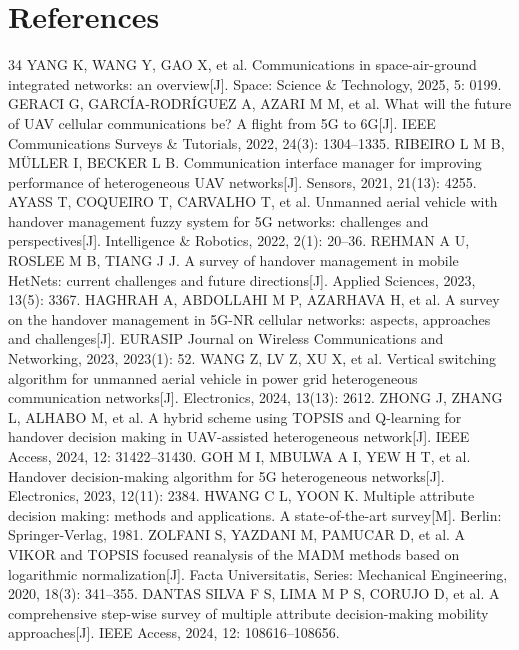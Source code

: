 \documentclass[10pt,a4paper]{article}
\begin{document}
\section*{References}
{\renewcommand{\refname}{}
\vspace{-2.5em}
\begin{thebibliography}{34}
 YANG K, WANG Y, GAO X, et al. Communications in space-air-ground integrated networks: an overview[J]. Space: Science \& Technology, 2025, 5: 0199.
 GERACI G, GARCÍA-RODRÍGUEZ A, AZARI M M, et al. What will the future of UAV cellular communications be? A flight from 5G to 6G[J]. IEEE Communications Surveys \& Tutorials, 2022, 24(3): 1304--1335.
 RIBEIRO L M B, M\"ULLER I, BECKER L B. Communication interface manager for improving performance of heterogeneous UAV networks[J]. Sensors, 2021, 21(13): 4255.
 AYASS T, COQUEIRO T, CARVALHO T, et al. Unmanned aerial vehicle with handover management fuzzy system for 5G networks: challenges and perspectives[J]. Intelligence \& Robotics, 2022, 2(1): 20--36.
 REHMAN A U, ROSLEE M B, TIANG J J. A survey of handover management in mobile HetNets: current challenges and future directions[J]. Applied Sciences, 2023, 13(5): 3367.
 HAGHRAH A, ABDOLLAHI M P, AZARHAVA H, et al. A survey on the handover management in 5G-NR cellular networks: aspects, approaches and challenges[J]. EURASIP Journal on Wireless Communications and Networking, 2023, 2023(1): 52.
 WANG Z, LV Z, XU X, et al. Vertical switching algorithm for unmanned aerial vehicle in power grid heterogeneous communication networks[J]. Electronics, 2024, 13(13): 2612.
 ZHONG J, ZHANG L, ALHABO M, et al. A hybrid scheme using TOPSIS and Q-learning for handover decision making in UAV-assisted heterogeneous network[J]. IEEE Access, 2024, 12: 31422--31430.
 GOH M I, MBULWA A I, YEW H T, et al. Handover decision-making algorithm for 5G heterogeneous networks[J]. Electronics, 2023, 12(11): 2384.
 HWANG C L, YOON K. Multiple attribute decision making: methods and applications. A state-of-the-art survey[M]. Berlin: Springer-Verlag, 1981.
 ZOLFANI S, YAZDANI M, PAMUCAR D, et al. A VIKOR and TOPSIS focused reanalysis of the MADM methods based on logarithmic normalization[J]. Facta Universitatis, Series: Mechanical Engineering, 2020, 18(3): 341--355.
 DANTAS SILVA F S, LIMA M P S, CORUJO D, et al. A comprehensive step-wise survey of multiple attribute decision-making mobility approaches[J]. IEEE Access, 2024, 12: 108616--108656.

\end{thebibliography}}
\end{document}
